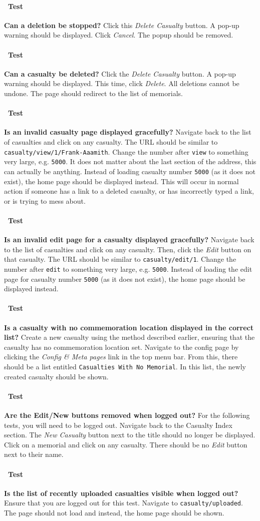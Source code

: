 \documentclass[12pt]{article}
\newcounter{Test}
\newcommand{\test}[1]{%
\stepcounter{Test}%
\paragraph{\Circle\ Test \theTest} \textbf{#1} }
\begin{document}
\test{Can a deletion be stopped?}
Click this \textit{Delete Casualty} button. A pop-up warning should be displayed. Click \textit{Cancel}. The popup should be removed.

\test{Can a casualty be deleted?}
Click the \textit{Delete Casualty} button. A pop-up warning should be displayed. This time, click \textit{Delete}. All deletions cannot be undone. The page should redirect to the list of memorials.

\test{Is an invalid casualty page displayed gracefully?}
Navigate back to the list of casualties and click on any casualty. The URL should be similar to \texttt{casualty/view/1/Frank-Aaamith}. Change the number after \texttt{view} to something very large, e.g. \texttt{5000}. It does not matter about the last section of the address, this can actually be anything. Instead of loading casualty number \texttt{5000} (as it does not exist), the home page should be displayed instead. This will occur in normal action if someone has a link to a deleted casualty, or has incorrectly typed a link, or is trying to mess about.

\test{Is an invalid edit page for a casualty displayed gracefully?}
Navigate back to the list of casualties and click on any casualty. Then, click the \textit{Edit} button on that casualty. The URL should be similar to \texttt{casualty/edit/1}. Change the number after \texttt{edit} to something very large, e.g. \texttt{5000}. Instead of loading the edit page for casualty number \texttt{5000} (as it does not exist), the home page should be displayed instead.

\test{Is a casualty with no commemoration location displayed in the correct list?}
Create a new casualty using the method described earlier, ensuring that the casualty has no commemoration location set. Navigate to the config page by clicking the \textit{Config \& Meta pages} link in the top menu bar. From this, there should be a list entitled \texttt{Casualties With No Memorial}. In this list, the newly created casualty should be shown.

\test{Are the Edit/New buttons removed when logged out?}
For the following tests, you will need to be logged out. Navigate back to the Casualty Index section. The \textit{New Casualty} button next to the title should no longer be displayed. Click on a memorial and click on any casualty. There should be no \textit{Edit} button next to their name.

\test{Is the list of recently uploaded casualties visible when logged out?}
Ensure that you are logged out for this test. Navigate to \texttt{casualty/uploaded}. The page should not load and instead, the home page should be shown.
\end{document}
